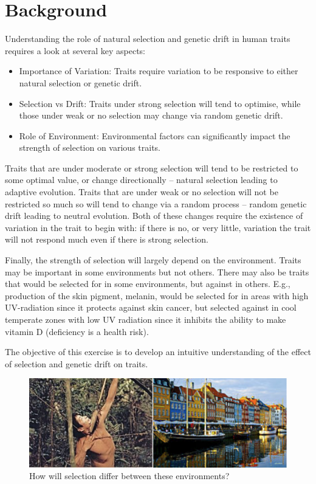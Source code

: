 \documentclass[
  a4paper]{book}
\providecommand{\tightlist}{%
  \setlength{\itemsep}{0pt}\setlength{\parskip}{0pt}}
\begin{document}
\section{Background}\label{background-13}

Understanding the role of natural selection and genetic drift in human traits requires a look at several key aspects:

\begin{itemize}
\tightlist
\item
  Importance of Variation: Traits require variation to be responsive to either natural selection or genetic drift.
\item
  Selection vs Drift: Traits under strong selection will tend to optimise, while those under weak or no selection may change via random genetic drift.
\item
  Role of Environment: Environmental factors can significantly impact the strength of selection on various traits.
\end{itemize}

Traits that are under moderate or strong selection will tend to be restricted to some optimal value, or change directionally -- natural selection leading to adaptive evolution. Traits that are under weak or no selection will not be restricted so much so will tend to change via a random process -- random genetic drift leading to neutral evolution. Both of these changes require the existence of variation in the trait to begin with: if there is no, or very little, variation the trait will not respond much even if there is strong selection.

Finally, the strength of selection will largely depend on the environment. Traits may be important in some environments but not others. There may also be traits that would be selected for in some environments, but against in others. E.g., production of the skin pigment, melanin, would be selected for in areas with high UV-radiation since it protects against skin cancer, but selected against in cool temperate zones with low UV radiation since it inhibits the ability to make vitamin D (deficiency is a health risk).

The objective of this exercise is to develop an intuitive understanding of the effect of selection and genetic drift on traits.

\begin{figure}

{\centering \includegraphics[width=0.5\linewidth]{images/huntergathererDK} 

}

\caption{How will selection differ between these environments?}\label{fig:huntergatherer}
\end{figure}
\end{document}
